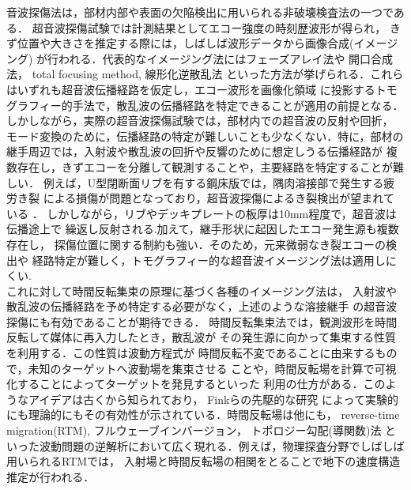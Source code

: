 ﻿音波探傷法は，部材内部や表面の欠陥検出に用いられる非破壊検査法の一つである．
超音波探傷試験では計測結果としてエコー強度の時刻歴波形が得られ，
きず位置や大きさを推定する際には，しばしば波形データから画像合成(イメージング)
が行われる．代表的なイメージング法にはフェーズアレイ法\cite{Wilcox2007}や
開口合成法\cite{Thomson1984, Doctor1986,Langenberg1986, Schmitz2000,Spies2012}，
total focusing method\cite{Holmes2008, Zhang2010}, 
線形化逆散乱法\cite{Langenberg1989, Kitahara2002, Shlivinski2007}
といった方法が挙げられる．これらはいずれも超音波伝播経路を仮定し，エコー波形を画像化領域
に投影するトモグラフィー的手法で，散乱波の伝播経路を特定できることが適用の前提となる．
%
しかしながら，実際の超音波探傷試験では，部材内での超音波の反射や回折，
モード変換のために，伝播経路の特定が難しいことも少なくない．特に，部材の
継手周辺では，入射波や散乱波の回折や反響のために想定しうる伝播経路が
複数存在し，きずエコーを分離して観測することや，主要経路を特定することが難しい．
例えば，U型閉断面リブを有する鋼床版では，隅肉溶接部で発生する疲労き裂
による損傷が問題となっており，超音波探傷によるき裂検出が望まれている
\cite{Urib3}．
しかしながら，リブやデッキプレートの板厚は10mm程度で，超音波は伝播途上で
繰返し反射される.加えて，継手形状に起因したエコー発生源も複数存在し，
探傷位置に関する制約も強い．そのため，元来微弱なき裂エコーの検出や
経路特定が難しく，トモグラフィー的な超音波イメージング法は適用しにくい.
\\
\hspace{\parindent}
これに対して時間反転集束の原理に基づく各種のイメージング法\cite{FinkTextBook}は，
入射波や散乱波の伝播経路を予め特定する必要がなく，上述のような溶接継手
の超音波探傷にも有効であることが期待できる．
時間反転集束法では，観測波形を時間反転して媒体に再入力したとき，散乱波が
その発生源に向かって集束する性質を利用する．この性質は波動方程式が
時間反転不変であることに由来するもので，未知のターゲットへ波動場を集束させる
ことや，時間反転場を計算で可視化することによってターゲットを発見するといった
利用の仕方がある．このようなアイデアは古くから知られており，
Finkらの先駆的な研究\cite{Fink1992, Prada1994, Prada1995, Prada1995_2,  Mordant1999}
によって実験的にも理論的にもその有効性が示されている．時間反転場は他にも，
reverse-time migration(RTM)\cite{Yan2008, Etgen2009, Velichko2010, Chung2012, Jones,KK_RTM}, 
フルウェーブインバージョン\cite{Fichtner, Talantola1984}，
トポロジー勾配(導関数)法\cite{Dominguez2005, Dominguez2010, Gibiat2010, Bonnet2008, Saitoh2021}
といった波動問題の逆解析において広く現れる．例えば，物理探査分野でしばしば用いられるRTMでは，
入射場と時間反転場の相関をとることで地下の速度構造推定が行われる． 
